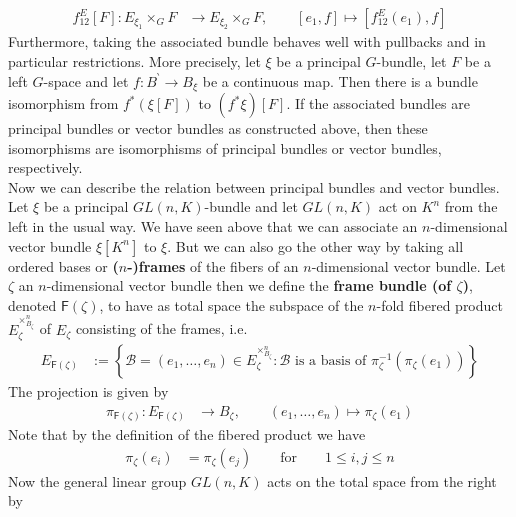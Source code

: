 \begin{align*}
  f_{12}^{E}[F]
  \colon
  E_{\xi_{1}} \times_{G} F
  &\to
  E_{\xi_{2}} \times_{G} F
  ,\qquad
  [e_{1},f]
  \mapsto
  [f_{12}^{E}(e_{1}),f]
\end{align*}
Furthermore, taking the associated bundle behaves well with pullbacks and in particular restrictions. More precisely, let $\xi$ be a principal $G$-bundle, let $F$ be a left $G$-space and let $f \colon B^{\backprime} \to B_{\xi}$ be a continuous map. Then there is a bundle isomorphism from $f^{\ast}(\xi[F])$ to $(f^{\ast}\xi)[F]$. If the associated bundles are principal bundles or vector bundles as constructed above, then these isomorphisms are isomorphisms of principal bundles or vector bundles, respectively.
\\
Now we can describe the relation between principal bundles and vector bundles. Let $\xi$ be a principal $GL(n,K)$-bundle and let $GL(n,K)$ act on $K^{n}$ from the left in the usual way. We have seen above that we can associate an $n$-dimensional vector bundle $\xi[K^{n}]$ to $\xi$. But we can also go the other way by taking all ordered bases or \textbf{($n$-)frames} of the fibers of an $n$-dimensional vector bundle. Let $\zeta$ an $n$-dimensional vector bundle then we define the \textbf{frame bundle (of $\zeta$)}, denoted $\mathsf{F}(\zeta)$, to have as total space the subspace of the $n$-fold fibered product $E_{\zeta}^{\times_{B_{\zeta}}^{n}}$ of $E_{\zeta}$ consisting of the frames, i.e.
\begin{align*}
  E_{\mathsf{F}(\zeta)}
  &:=
  \left\lbrace
    \mathcal{B}
    =
    (e_{1},\ldots,e_{n})
    \in
    E_{\zeta}^{\times_{B_{\zeta}}^{n}}
    \colon
    \mathcal{B}
    \text{ is a basis of }
    \pi_{\zeta}^{-1}
    \left(
      \pi_{\zeta}(e_{1})
    \right)
  \right\rbrace
\end{align*}
The projection is given by
\begin{align*}
  \pi_{\mathsf{F}(\zeta)}
  \colon
  E_{\mathsf{F}(\zeta)}
  &\to
  B_{\zeta}
  ,\qquad
  (e_{1},\ldots,e_{n})
  \mapsto
  \pi_{\zeta}(e_{1})
\end{align*}
Note that by the definition of the fibered product we have
\begin{align*}
  \pi_{\zeta}(e_{i})
  &=
  \pi_{\zeta}(e_{j})
  \qquad
  \text{for}
  \qquad
  1
  \leq
  i,j
  \leq
  n
\end{align*}
Now the general linear group $GL(n,K)$ acts on the total space from the right by
\\\\
